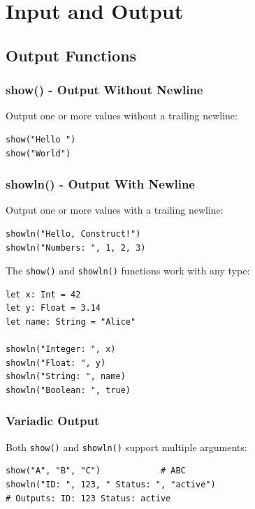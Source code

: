 \documentclass[11pt,twoside,openright]{book}
\begin{document}
\chapter{Input and Output}

\section{Output Functions}

\subsection{show() - Output Without Newline}

Output one or more values without a trailing newline:

\begin{lstlisting}[language=ConstructLang]
show("Hello ")
show("World")
\end{lstlisting}

\subsection{showln() - Output With Newline}

Output one or more values with a trailing newline:

\begin{lstlisting}[language=ConstructLang]
showln("Hello, Construct!")
showln("Numbers: ", 1, 2, 3)
\end{lstlisting}

The \texttt{show()} and \texttt{showln()} functions work with any type:

\begin{lstlisting}[language=ConstructLang]
let x: Int = 42
let y: Float = 3.14
let name: String = "Alice"

showln("Integer: ", x)
showln("Float: ", y)
showln("String: ", name)
showln("Boolean: ", true)
\end{lstlisting}

\subsection{Variadic Output}

Both \texttt{show()} and \texttt{showln()} support multiple arguments:

\begin{lstlisting}[language=ConstructLang]
show("A", "B", "C")            # ABC
showln("ID: ", 123, " Status: ", "active")
# Outputs: ID: 123 Status: active
\end{lstlisting}
\end{document}

